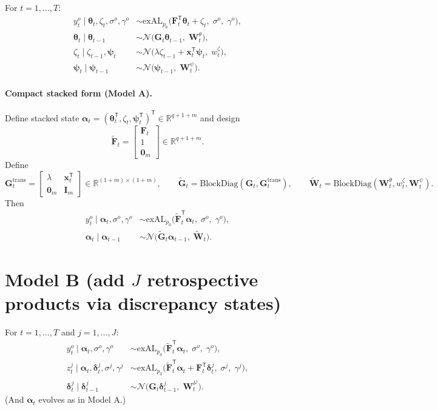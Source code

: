 \documentclass[11pt]{article}
\newcommand{\R}{\mathbb{R}}
\newcommand{\1}{\mathbb{I}}
\newcommand{\N}{\mathcal{N}}
\newcommand{\BlockDiag}{\mathrm{BlockDiag}}
\newcommand{\T}{\mathsf{T}}
\begin{document}
For $t=1,\dots,T$:
\begin{align}
y_t^o \mid \bm\theta_t,\zeta_t,\sigma^o,\gamma^o
&\sim \mathrm{exAL}_{p_0}\!\big(\bm F_t^\T\bm\theta_t+\zeta_t,\;\sigma^o,\;\gamma^o\big), \label{eq:A_obs}\\
\bm\theta_t \mid \bm\theta_{t-1}
&\sim \N\!\big(\bm G_t\bm\theta_{t-1},\;\bm W_t^\theta\big), \label{eq:A_theta}\\
\zeta_t \mid \zeta_{t-1},\bm\psi_t
&\sim \N\!\big(\lambda\zeta_{t-1}+\bm x_t^\T\bm\psi_t,\;w_t^\zeta\big), \label{eq:A_zeta}\\
\bm\psi_t \mid \bm\psi_{t-1}
&\sim \N\!\big(\bm\psi_{t-1},\;\bm W_t^\psi\big). \label{eq:A_psi}
\end{align}

\paragraph{Compact stacked form (Model A).}
Define stacked state $\bm\alpha_t = (\bm\theta_t^\T,\zeta_t,\bm\psi_t^\T)^\T\in\R^{q+1+m}$ and design
\[
\tilde{\bm F}_t=
\begin{bmatrix}
\bm F_t \\ 1 \\ \bm 0_m
\end{bmatrix}\in\R^{q+1+m}.
\]
Define
\[
\bm G_t^{\mathrm{trans}}=
\begin{bmatrix}
\lambda & \bm x_t^\T\\
\bm 0_m & \bm I_m
\end{bmatrix}\in\R^{(1+m)\times(1+m)},
\qquad
\tilde{\bm G}_t=\BlockDiag(\bm G_t,\bm G_t^{\mathrm{trans}}),
\qquad
\tilde{\bm W}_t=\BlockDiag(\bm W_t^\theta,w_t^\zeta,\bm W_t^\psi).
\]
Then
\begin{align}
y_t^o \mid \bm\alpha_t,\sigma^o,\gamma^o
&\sim \mathrm{exAL}_{p_0}\!\big(\tilde{\bm F}_t^\T\bm\alpha_t,\;\sigma^o,\;\gamma^o\big), \\
\bm\alpha_t \mid \bm\alpha_{t-1}
&\sim \N\!\big(\tilde{\bm G}_t\bm\alpha_{t-1},\;\tilde{\bm W}_t\big).
\end{align}

\section{Model B (add \texorpdfstring{$J$}{J} retrospective products via discrepancy states)}

For $t=1,\dots,T$ and $j=1,\dots,J$:
\begin{align}
y_t^o \mid \bm\alpha_t,\sigma^o,\gamma^o
&\sim \mathrm{exAL}_{p_0}\!\big(\tilde{\bm F}_t^\T\bm\alpha_t,\;\sigma^o,\;\gamma^o\big),\\
z_t^j \mid \bm\alpha_t,\bm\delta_t^j,\sigma^j,\gamma^j
&\sim \mathrm{exAL}_{p_0}\!\big(\tilde{\bm F}_t^\T\bm\alpha_t+\bm F_t^\T\bm\delta_t^j,\;\sigma^j,\;\gamma^j\big),\label{eq:B_obs}\\
\bm\delta_t^j \mid \bm\delta_{t-1}^j
&\sim \N\!\big(\bm G_t\bm\delta_{t-1}^j,\;\bm W_t^{\delta^j}\big). \label{eq:B_delta}
\end{align}
(And $\bm\alpha_t$ evolves as in Model A.)
\end{document}

